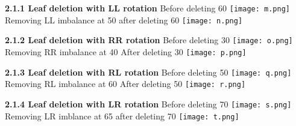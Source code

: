 \documentclass[12pt]{article}
\begin{document}
\begin{enumerate}
        \textbf{2.1.1 Leaf deletion with LL rotation}\newline
        Before deleting 60 \newline \newline
            \texttt{[image: m.png]} \newline 
        Removing LL imbalance at 50 after deleting 60 \newline \newline
            \texttt{[image: n.png]}\newline \newpage
            
        \textbf{2.1.2 Leaf deletion with RR rotation}\newline
        Before deleting 30 \newline \newline
            \texttt{[image: o.png]} \newline 
        Removing RR imbalance at 40 After deleting 30 \newline \newline
            \texttt{[image: p.png]}\newline
            \newpage
            
        \textbf{2.1.3 Leaf deletion with RL rotation}\newline
        Before deleting 50 \newline \newline
            \texttt{[image: q.png]} \newline 
        Removing RL imbalance at 60 After deleting 50 \newline \newline
            \texttt{[image: r.png]}\newline
            \newpage
            
        \textbf{2.1.4 Leaf deletion with LR rotation}\newline
        Before deleting 70 \newline \newline
            \texttt{[image: s.png]} \newline 
        Removing LR imblance at 65 after deleting 70 \newline \newline
            \texttt{[image: t.png]} 
        \newpage
        

\end{enumerate}
\end{document}
